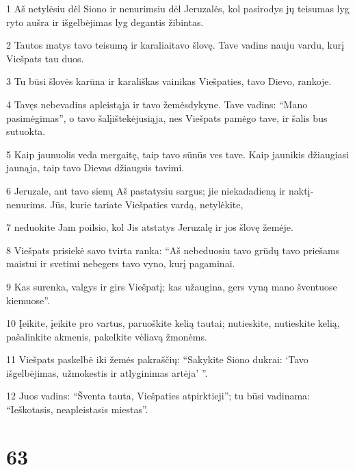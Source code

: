\par 1 Aš netylėsiu dėl Siono ir nenurimsiu dėl Jeruzalės, kol pasirodys jų teisumas lyg ryto aušra ir išgelbėjimas lyg degantis žibintas. 
\par 2 Tautos matys tavo teisumą ir karaliai­tavo šlovę. Tave vadins nauju vardu, kurį Viešpats tau duos. 
\par 3 Tu būsi šlovės karūna ir karališkas vainikas Viešpaties, tavo Dievo, rankoje. 
\par 4 Tavęs nebevadins apleistąja ir tavo žemės­dykyne. Tave vadins: “Mano pasimėgimas”, o tavo šalį­ištekėjusiąja, nes Viešpats pamėgo tave, ir šalis bus sutuokta. 
\par 5 Kaip jaunuolis veda mergaitę, taip tavo sūnūs ves tave. Kaip jaunikis džiaugiasi jaunąja, taip tavo Dievas džiaugsis tavimi. 
\par 6 Jeruzale, ant tavo sienų Aš pastatysiu sargus; jie niekada­dieną ir naktį­nenurims. Jūs, kurie tariate Viešpaties vardą, netylėkite, 
\par 7 neduokite Jam poilsio, kol Jis atstatys Jeruzalę ir jos šlovę žemėje. 
\par 8 Viešpats prisiekė savo tvirta ranka: “Aš nebeduosiu tavo grūdų tavo priešams maistui ir svetimi nebegers tavo vyno, kurį pagaminai. 
\par 9 Kas surenka, valgys ir girs Viešpatį; kas užaugina, gers vyną mano šventuose kiemuose”. 
\par 10 Įeikite, įeikite pro vartus, paruoškite kelią tautai; nutieskite, nutieskite kelią, pašalinkite akmenis, pakelkite vėliavą žmonėms. 
\par 11 Viešpats paskelbė iki žemės pakraščių: “Sakykite Siono dukrai: ‘Tavo išgelbėjimas, užmokestis ir atlyginimas artėja’ ”. 
\par 12 Juos vadins: “Šventa tauta, Viešpaties atpirktieji”; tu būsi vadinama: “Ieškotasis, neapleistasis miestas”.



\chapter{63}



